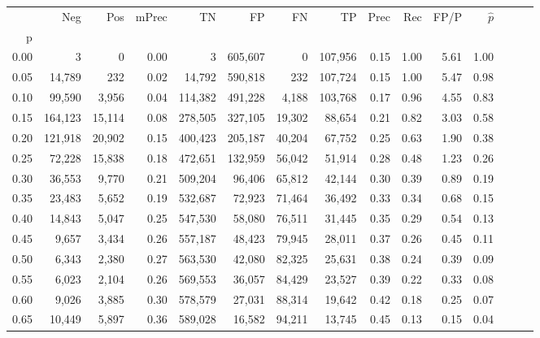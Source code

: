 \begin{tabular}{rrrrrrrrrrrrrrr}
\toprule
{} &      Neg &     Pos & mPrec &       TN &       FP &       FN &       TP &  Prec &   Rec &  FP/P & $\hat{p}$ \\
p    &          &         &       &          &          &          &          &       &       &       &           \\
\midrule
0.00 &        3 &       0 &  0.00 &        3 &  605,607 &        0 &  107,956 &  0.15 &  1.00 &  5.61 &      1.00 \\
0.05 &   14,789 &     232 &  0.02 &   14,792 &  590,818 &      232 &  107,724 &  0.15 &  1.00 &  5.47 &      0.98 \\
0.10 &   99,590 &   3,956 &  0.04 &  114,382 &  491,228 &    4,188 &  103,768 &  0.17 &  0.96 &  4.55 &      0.83 \\
0.15 &  164,123 &  15,114 &  0.08 &  278,505 &  327,105 &   19,302 &   88,654 &  0.21 &  0.82 &  3.03 &      0.58 \\
0.20 &  121,918 &  20,902 &  0.15 &  400,423 &  205,187 &   40,204 &   67,752 &  0.25 &  0.63 &  1.90 &      0.38 \\
0.25 &   72,228 &  15,838 &  0.18 &  472,651 &  132,959 &   56,042 &   51,914 &  0.28 &  0.48 &  1.23 &      0.26 \\
0.30 &   36,553 &   9,770 &  0.21 &  509,204 &   96,406 &   65,812 &   42,144 &  0.30 &  0.39 &  0.89 &      0.19 \\
0.35 &   23,483 &   5,652 &  0.19 &  532,687 &   72,923 &   71,464 &   36,492 &  0.33 &  0.34 &  0.68 &      0.15 \\
0.40 &   14,843 &   5,047 &  0.25 &  547,530 &   58,080 &   76,511 &   31,445 &  0.35 &  0.29 &  0.54 &      0.13 \\
0.45 &    9,657 &   3,434 &  0.26 &  557,187 &   48,423 &   79,945 &   28,011 &  0.37 &  0.26 &  0.45 &      0.11 \\
0.50 &    6,343 &   2,380 &  0.27 &  563,530 &   42,080 &   82,325 &   25,631 &  0.38 &  0.24 &  0.39 &      0.09 \\
0.55 &    6,023 &   2,104 &  0.26 &  569,553 &   36,057 &   84,429 &   23,527 &  0.39 &  0.22 &  0.33 &      0.08 \\
0.60 &    9,026 &   3,885 &  0.30 &  578,579 &   27,031 &   88,314 &   19,642 &  0.42 &  0.18 &  0.25 &      0.07 \\
0.65 &   10,449 &   5,897 &  0.36 &  589,028 &   16,582 &   94,211 &   13,745 &  0.45 &  0.13 &  0.15 &      0.04 \\

\end{tabular}
